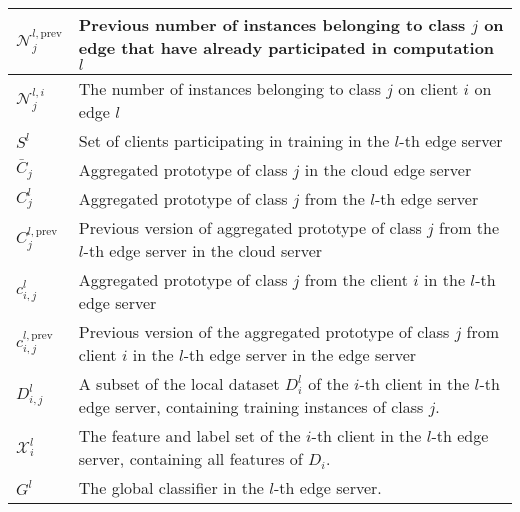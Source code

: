\documentclass[journal]{IEEEtran}
\begin{document}
\begin{table}[H]
\begin{tabular}{|@{}m{1cm}<{\centering}|m{6.5cm}|}
    \( {\mathcal{N}_j^{l,\text{prev}}}  \) & Previous number of instances belonging to class \( j \) on edge that have already participated in computation $l$                               \\
    \hline
    \(\mathcal{N}_j^{l, i}\) & The number of instances belonging to class \( j \) on client \( i \) on edge \( l \) \\ 
    \hline

    \( S^{l} \)                           & Set of clients participating in training in the \( l \)-th edge server                                                                \\
    \hline
    \( \bar{C}_j \)                       & Aggregated prototype of class $j$ in the cloud edge server                                                                            \\
    \hline
    \( C^l_j \)                           & Aggregated prototype of class $j$ from the \( l \)-th edge server                                                                     \\
    \hline
    \( C^{l,\text{prev}}_j \)              & Previous version of aggregated prototype of class $j$ from the \( l \)-th edge server in the cloud server                          \\
    \hline
    \( c^l_{i, j} \)                      & Aggregated prototype of class $j$ from the client \(i\) in  the \( l \)-th edge server                                                \\
    \hline
    \( c_{i, j}^{l, \text{prev}} \)        & Previous version of the aggregated prototype of class \( j \) from client \( i \) in the \( l \)-th edge server in the edge server \\
    \hline
    \( D^l_{i,j} \)                         & A subset of the local dataset \(D^l_i\) of the $i$-th client in the $l$-th edge server, containing training instances of class $j$.                               \\
    \hline
    \( \mathcal{X}^l_i \) & The feature and label set of the $i$-th client in the $l$-th edge server, containing all features of $D_i$. \\
    \hline
    \( G^l \) & The global classifier in the $l$-th edge server. \\
    \hline
  \end{tabular}
\end{table}
\end{document}
